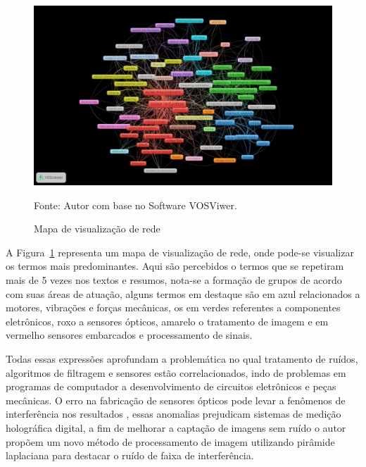 \begin{figure}[H]
	\centering
	\includegraphics[width=\textwidth,height=\textwidth]{anexos/ris/IEEE/Noise_reduction_and_noise_abatement_andsensor_filtering_algorithm/network_visualization_with_lines.png}
	\caption{Mapa de visualização de rede}
	Fonte: Autor com base no Software VOSViwer.
	\label{fig: network_visualization_with_lines}
\end{figure}

A Figura~\ref{fig: network_visualization_with_lines} representa um mapa de visualização de rede, onde pode-se visualizar os termos mais predominantes. Aqui são percebidos o termos que se repetiram mais de 5 vezes nos textos e resumos, nota-se a formação de grupos de acordo com suas áreas de atuação, alguns termos em destaque são em azul relacionados a motores, vibrações e forças mecânicas, os em verdes referentes a componentes eletrônicos, roxo a sensores ópticos, amarelo o tratamento de imagem e em vermelho sensores embarcados e processamento de sinais. 


Todas essas expressões aprofundam a problemática no qual tratamento de ruídos, algoritmos de filtragem e sensores estão correlacionados, indo de problemas em programas de computador a desenvolvimento de circuitos eletrônicos e peças mecânicas. O erro na fabricação de sensores ópticos pode levar a fenômenos de interferência nos resultados \cite{liu_interference_stripe}, essas anomalias prejudicam sistemas de medição holográfica digital, a fim de melhorar a captação de imagens sem ruído o autor propõem um novo método de processamento de imagem utilizando pirâmide laplaciana para destacar o ruído de faixa de interferência.

